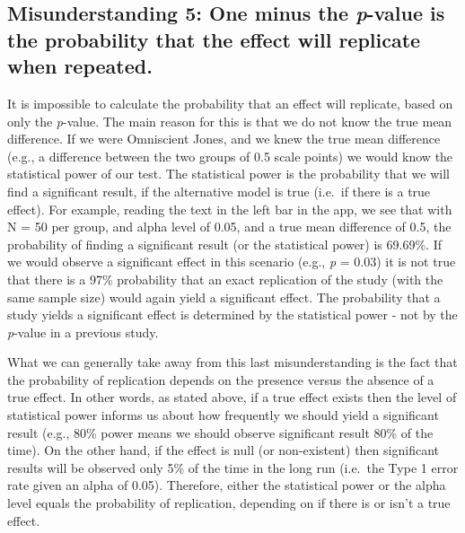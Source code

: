 \documentclass[
  oneside]{book}
\begin{document}
\hypertarget{misunderstanding-5-one-minus-the-p-value-is-the-probability-that-the-effect-will-replicate-when-repeated.}{%
\subsection{\texorpdfstring{Misunderstanding 5: One minus the \emph{p}-value is the probability that the effect will replicate when repeated.}{Misunderstanding 5: One minus the p-value is the probability that the effect will replicate when repeated.}}\label{misunderstanding-5-one-minus-the-p-value-is-the-probability-that-the-effect-will-replicate-when-repeated.}}

It is impossible to calculate the probability that an effect will replicate, based on only the \emph{p}-value. The main reason for this is that we do not know the true mean difference. If we were Omniscient Jones, and we knew the true mean difference (e.g., a difference between the two groups of 0.5 scale points) we would know the statistical power of our test. The statistical power is the probability that we will find a significant result, if the alternative model is true (i.e.~if there is a true effect). For example, reading the text in the left bar in the app, we see that with N = 50 per group, and alpha level of 0.05, and a true mean difference of 0.5, the probability of finding a significant result (or the statistical power) is 69.69\%. If we would observe a significant effect in this scenario (e.g., \emph{p} = 0.03) it is not true that there is a 97\% probability that an exact replication of the study (with the same sample size) would again yield a significant effect. The probability that a study yields a significant effect is determined by the statistical power - not by the \emph{p}-value in a previous study.

What we can generally take away from this last misunderstanding is the fact that the probability of replication depends on the presence versus the absence of a true effect. In other words, as stated above, if a true effect exists then the level of statistical power informs us about how frequently we should yield a significant result (e.g., 80\% power means we should observe significant result 80\% of the time). On the other hand, if the effect is null (or non-existent) then significant results will be observed only 5\% of the time in the long run (i.e.~the Type 1 error rate given an alpha of 0.05). Therefore, either the statistical power or the alpha level equals the probability of replication, depending on if there is or isn't a true effect.
\end{document}
